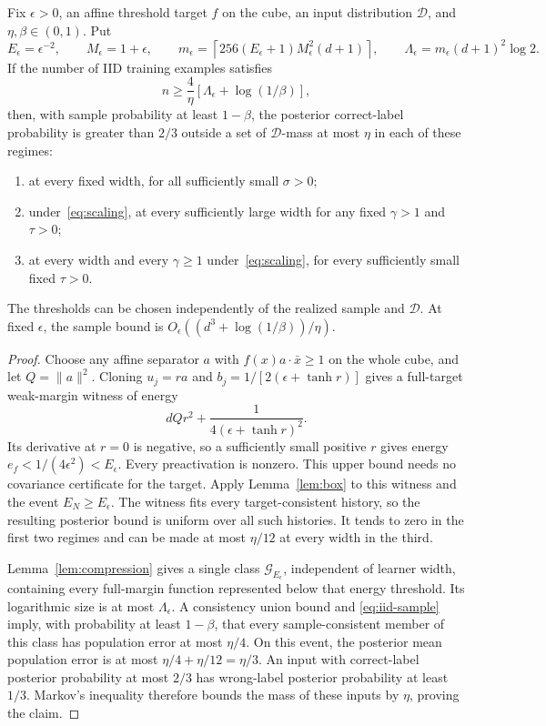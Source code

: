 \begin{theorem}\label{thm:iid}
Fix $\epsilon>0$, an affine threshold target $f$ on the cube, an input
distribution $\mathcal D$, and $\eta,\beta\in(0,1)$. Put
\[
 E_\epsilon=\epsilon^{-2},\qquad M_\epsilon=1+\epsilon,
 \qquad
 m_\epsilon=
 \left\lceil256(E_\epsilon+1)M_\epsilon^2(d+1)\right\rceil,
 \qquad \Lambda_\epsilon=m_\epsilon(d+1)^2\log2.
\]
If the number of IID training examples satisfies
\begin{equation}\label{eq:iid-sample}
 n\ge\frac4\eta
       \left[\Lambda_\epsilon+\log(1/\beta)\right],
\end{equation}
then, with sample probability at least $1-\beta$, the posterior
correct-label probability is greater than $2/3$ outside a set of
$\mathcal D$-mass at most $\eta$ in each of these regimes:
\begin{enumerate}
\item at every fixed width, for all sufficiently small $\sigma>0$;
\item under~\eqref{eq:scaling}, at every sufficiently large width for
any fixed $\gamma>1$ and $\tau>0$;
\item at every width and every $\gamma\ge1$ under~\eqref{eq:scaling},
for every sufficiently small fixed $\tau>0$.
\end{enumerate}
The thresholds can be chosen independently of the realized sample and
$\mathcal D$. At fixed $\epsilon$, the sample bound is
$O_\epsilon((d^3+\log(1/\beta))/\eta)$.
\end{theorem}
\begin{proof}
Choose any affine separator $a$ with $f(x)a\cdot\bar x\ge1$ on the
whole cube, and let $Q=\|a\|^2$. Cloning $u_j=ra$ and
$b_j=1/[2(\epsilon+\tanh r)]$ gives a full-target weak-margin witness
of energy
\[
 dQr^2+\frac1{4(\epsilon+\tanh r)^2}.
\]
Its derivative at $r=0$ is negative, so a sufficiently small positive
$r$ gives energy $e_f<1/(4\epsilon^2)<E_\epsilon$.
Every preactivation is nonzero. This upper bound needs no covariance
certificate for the target.
Apply Lemma~\ref{lem:box} to this witness and the event
$E_N\ge E_\epsilon$. The witness fits every target-consistent history,
so the resulting posterior bound is uniform over all such histories.
It tends to zero in the first two regimes and can be made at most
$\eta/12$ at every width in the third.

Lemma~\ref{lem:compression} gives a single class $\mathcal G_{E_\epsilon}$,
independent of learner width, containing every full-margin function
represented below that energy threshold. Its logarithmic size is at
most $\Lambda_\epsilon$. A consistency union bound and
\eqref{eq:iid-sample} imply, with probability at least $1-\beta$, that
every sample-consistent member of this class has population error at
most $\eta/4$. On this event, the posterior mean population error is
at most $\eta/4+\eta/12=\eta/3$.
An input with correct-label posterior probability at most $2/3$ has
wrong-label posterior probability at least $1/3$. Markov's inequality
therefore bounds the mass of these inputs by $\eta$, proving the claim.
\end{proof}
